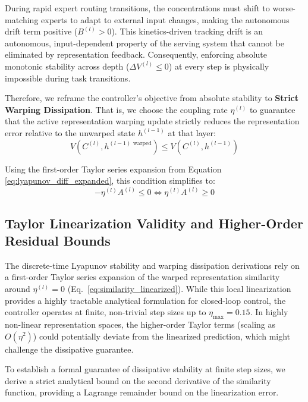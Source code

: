 During rapid expert routing transitions, the concentrations must shift to worse-matching experts to adapt to external input changes, making the autonomous drift term positive ($B^{(l)} > 0$). This kinetics-driven tracking drift is an autonomous, input-dependent property of the serving system that cannot be eliminated by representation feedback. Consequently, enforcing absolute monotonic stability across depth ($\Delta V^{(l)} \le 0$) at every step is physically impossible during task transitions.

Therefore, we reframe the controller's objective from absolute stability to \textbf{Strict Warping Dissipation}. That is, we choose the coupling rate $\eta^{(l)}$ to guarantee that the active representation warping update strictly reduces the representation error relative to the unwarped state $h^{(l-1)}$ at that layer:
\begin{equation}
V(C^{(l)}, h^{(l-1) \text{ warped}}) \le V(C^{(l)}, h^{(l-1)})
\label{eq:dissipation_objective}
\end{equation}

Using the first-order Taylor series expansion from Equation \eqref{eq:lyapunov_diff_expanded}, this condition simplifies to:
\begin{equation}
- \eta^{(l)} A^{(l)} \le 0 \iff \eta^{(l)} A^{(l)} \ge 0
\label{eq:stability_cond_final}
\end{equation}

\subsection{Taylor Linearization Validity and Higher-Order Residual Bounds}
\label{sec:taylor_validity}
The discrete-time Lyapunov stability and warping dissipation derivations rely on a first-order Taylor series expansion of the warped representation similarity around $\eta^{(l)} = 0$ (Eq.~\ref{eq:similarity_linearized}). While this local linearization provides a highly tractable analytical formulation for closed-loop control, the controller operates at finite, non-trivial step sizes up to $\eta_{\max} = 0.15$. In highly non-linear representation spaces, the higher-order Taylor terms (scaling as $O(\eta^2)$) could potentially deviate from the linearized prediction, which might challenge the dissipative guarantee.

To establish a formal guarantee of dissipative stability at finite step sizes, we derive a strict analytical bound on the second derivative of the similarity function, providing a Lagrange remainder bound on the linearization error.

